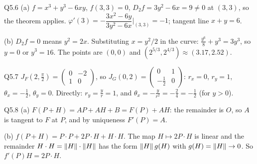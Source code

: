 \begin{solution}{Q5.6}
(a) $f=x^3+y^3-6xy$, $f(3,3)=0$, $D_2f=3y^2-6x=9\neq0$ at $(3,3)$, so the theorem applies.
$\varphi'(3)=-\dfrac{3x^2-6y}{3y^2-6x}\Big|_{(3,3)}=-1$; tangent line $x+y=6$.

(b) $D_2f=0$ means $y^2=2x$. Substituting $x=y^2/2$ in the curve: $\frac{y^6}{8}+y^3=3y^3$, so $y=0$ or
$y^3=16$. The points are $(0,0)$ and $(2^{5/3},2^{4/3})\approx(3.17,2.52)$.
\end{solution}

\begin{solution}{Q5.7}
$J_F(2,\frac\pi2)=\begin{pmatrix}0&-2\\1&0\end{pmatrix}$, so $J_G(0,2)=\begin{pmatrix}0&1\\-\frac12&0\end{pmatrix}$:
$r_x=0$, $r_y=1$, $\theta_x=-\frac12$, $\theta_y=0$. Directly: $r_y=\frac yr=1$, and
$\theta_x=-\frac{y}{r^2}=-\frac24=-\frac12$ (for $y>0$).
\end{solution}

\begin{solution}{Q5.8}
(a) $F(P+H)=AP+AH+B=F(P)+AH$: the remainder is $O$, so $A$ is tangent to $F$ at $P$, and by
uniqueness $F'(P)=A$.

(b) $f(P+H)=P\cdot P+2P\cdot H+H\cdot H$. The map $H\mapsto2P\cdot H$ is linear and the remainder
$H\cdot H=\left\lVert H\right\rVert\cdot\left\lVert H\right\rVert$ has the form $\left\lVert H\right\rVert g(H)$ with $g(H)=\left\lVert H\right\rVert\to0$. So $f'(P)H=2P\cdot H$.
\end{solution}
